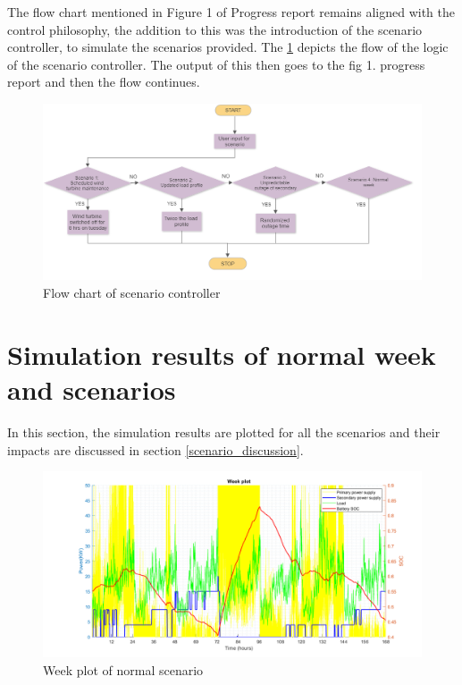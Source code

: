 \noindent The flow chart mentioned in Figure 1 of Progress report remains aligned with the control philosophy, the addition to this was the introduction of the scenario controller, to simulate the scenarios provided. The \ref{fig:scenario_control} depicts the flow of the logic of the scenario controller. The output of this then goes to the fig 1. progress report and then the flow continues.
\begin{figure}[H]
    \centering
    \includegraphics[width = 0.8 \linewidth]{Final_report/Images/Scenario_Controller.PNG}
    \caption{Flow chart of scenario controller}
    \label{fig:scenario_control}
\end{figure}

\newpage

\section{Simulation results of normal week and scenarios} \label{sec:simulation_plots}
In this section, the simulation results are plotted for all the scenarios and their impacts are discussed in section \ref{scenario_discussion}.

\begin{figure}[H]
    \centering
    \includegraphics[width=1 \linewidth]{Final_report/Images/Week_plot_normal.png}
    \caption{Week plot of normal scenario}
    \label{fig:week_plot_normal}
\end{figure}

